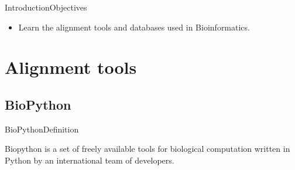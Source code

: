 \documentclass[10pt]{beamer}
\newcommand{\1}{
	\setbeamertemplate{background}{
		\texttt{[image: img/1]}
		\tikz[overlay] \fill[fill opacity=0.75,fill=white] (0,0) rectangle (-\paperwidth,\paperheight);
	}
}
\begin{document}
\begin{frame}{Introduction}{Objectives}
\begin{itemize}
    \item<1-> Learn the alignment tools and databases used in Bioinformatics. 
  \end{itemize}
\end{frame}


\section{Alignment tools}

\subsection{BioPython}

\begin{frame}{BioPython}{Definition}
	\begin{block}{}
		Biopython is a set of freely available tools for biological computation written in Python by an international team of developers.
	\end{block}
\end{frame}
\end{document}
